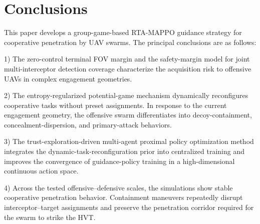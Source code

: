 \documentclass{cja}
\begin{document}
\section{Conclusions}
\label{sec:conclusion}

This paper develops a group-game-based RTA-MAPPO guidance strategy for cooperative penetration by UAV swarms. The principal conclusions are as follows:

1) The zero-control terminal FOV margin and the safety-margin model for joint multi-interceptor detection coverage characterize the acquisition risk to offensive UAVs in complex engagement geometries.

2) The entropy-regularized potential-game mechanism dynamically reconfigures cooperative tasks without preset assignments. In response to the current engagement geometry, the offensive swarm differentiates into decoy-containment, concealment-dispersion, and primary-attack behaviors.

3) The trust-exploration-driven multi-agent proximal policy optimization method integrates the dynamic-task-reconfiguration prior into centralized training and improves the convergence of guidance-policy training in a high-dimensional continuous action space.

4) Across the tested offensive--defensive scales, the simulations show stable cooperative penetration behavior. Containment maneuvers repeatedly disrupt interceptor--target assignments and preserve the penetration corridor required for the swarm to strike the HVT.
\end{document}
